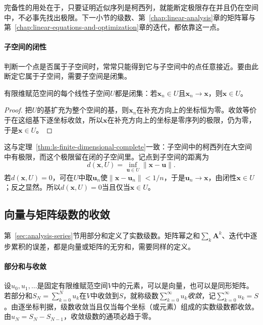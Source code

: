 完备性的用处在于，只要证明近似序列是柯西列，就能断定极限存在并且仍在空间中，不必事先找出极限。下一小节的级数、第~\ref{chap:linear-analysis}章的矩阵幂与第~\ref{chap:linear-equations-and-optimization}章的迭代，都依靠这一点。

\paragraph{子空间的闭性}
判断一个点是否属于子空间时，常常只能得到它与子空间中的点任意接近。要由此断定它属于子空间，需要子空间是闭集。
\begin{theorem}[有限维子空间闭性]
\label{thm:ls-subspace-closed}
有限维赋范空间的每个线性子空间$U$都是闭集：若$\bm x_n\in U$且$\bm x_n\to\bm x$，则$\bm x\in U$。
\end{theorem}
\begin{proof}
把$U$的基扩充为整个空间的基，则$\bm x_n$在补充方向上的坐标恒为零。收敛等价于在这组基下逐坐标收敛，所以$\bm x$在补充方向上的坐标是零序列的极限，仍为零，于是$\bm x\in U$。
\end{proof}
这与定理~\ref{thm:ls-finite-dimensional-complete}一致：子空间中的柯西列在大空间中有极限，而这个极限留在闭的子空间里。记点到子空间的距离为
\[
 d(\bm x,U)=\inf_{\bm u\in U}\lVert\bm x-\bm u\rVert.
\]
若$d(\bm x,U)=0$，可在$U$中取$\bm u_n$使$\lVert\bm x-\bm u_n\rVert<1/n$，于是$\bm u_n\to\bm x$，由闭性$\bm x\in U$；反之显然。所以$d(\bm x,U)=0$当且仅当$\bm x\in U$。

\subsection{向量与矩阵级数的收敛}
\label{sec:ls-vector-matrix-series}

第~\ref{sec:analysis-series}节用部分和定义了实数级数。矩阵幂之和$\sum_k\bm A^k$、迭代中逐步累积的误差，都是向量或矩阵的无穷和，需要同样的定义。

\paragraph{部分和与收敛}
设$u_0,u_1,\ldots$是固定有限维赋范空间$V$中的元素，可以是向量，也可以是同形矩阵。若部分和$S_N=\sum_{k=0}^Nu_k$在$V$中收敛到$S$，就称级数$\sum_{k=0}^\infty u_k$\emph{收敛}，记$\sum_{k=0}^\infty u_k=S$。由逐坐标判据，级数收敛当且仅当每个坐标（或元素）组成的实数级数都收敛。由$u_N=S_N-S_{N-1}$，收敛级数的通项必趋于零。

